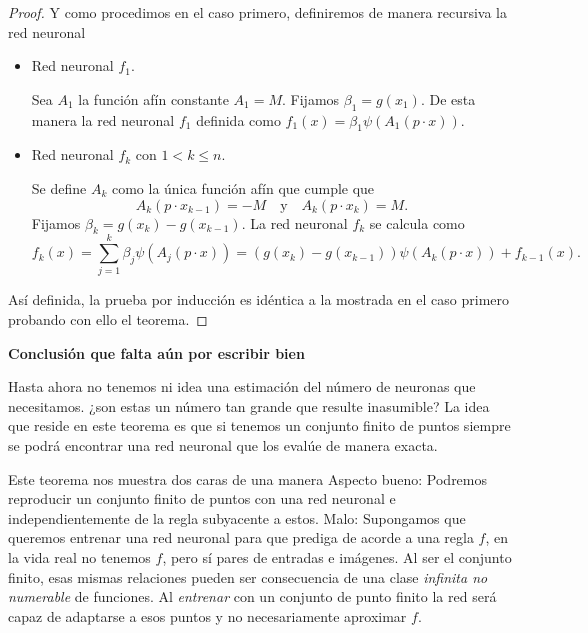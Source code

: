 \begin{proof}
 Y como procedimos en el caso primero, definiremos de manera
 recursiva la red neuronal

 \begin{itemize}
 \item Red neuronal $f_1$. 

Sea $A_1$ la función afín constante $A_1 = M.$
Fijamos $\beta_1 = g(x_1)$. 
De esta manera la red neuronal $f_1$ 
definida como $f_1(x) = \beta_1 \psi(A_1(p \cdot x)).$

\item Red neuronal $f_k$ con $1 < k \leq n$. 

Se define $A_{k}$ como la única función afín que cumple que 
\begin{equation}
    A_k(p \cdot x_{k-1}) = -M 
    \quad \text{y} \quad 
     A_{k}(p \cdot x_k)= M.
\end{equation}
Fijamos $\beta_k = g(x_k) - g(x_{k-1})$. 
La red neuronal $f_k$ se calcula como 
\begin{equation}
    f_k(x) 
    = 
    \sum_{j=1}^k \beta_j \psi(A_j(p \cdot x))
     = 
    (g(x_k)-g(x_{k-1})) \psi(A_k(p \cdot x)) + f_{k-1}(x) .  
\end{equation}
\end{itemize}

Así definida, la prueba por inducción es idéntica a la mostrada 
en el caso primero probando con ello el teorema.

\end{proof}

\textbf{Conclusión que falta aún por escribir bien}

Hasta ahora no tenemos ni idea una estimación del número de 
neuronas que necesitamos.  ¿son estas un número tan grande que 
resulte inasumible?
La idea que reside en este teorema es que si tenemos un conjunto
finito de puntos siempre se podrá encontrar una red neuronal 
que los evalúe de manera exacta. 

Este teorema nos muestra dos caras de una manera 
Aspecto bueno: 
Podremos reproducir un conjunto finito de puntos con una red neuronal e independientemente de la regla subyacente a estos. 
Malo: 
Supongamos que queremos entrenar una red neuronal para que prediga 
de acorde a una regla $f$, en la vida real no tenemos $f$, pero sí
pares de entradas e imágenes. Al ser el conjunto finito, 
esas mismas relaciones pueden ser consecuencia de una clase 
\textit{infinita no numerable} de funciones. 
Al \textit{entrenar} con un conjunto de punto finito  la red será capaz de adaptarse  a esos puntos y no 
necesariamente aproximar $f$. 

